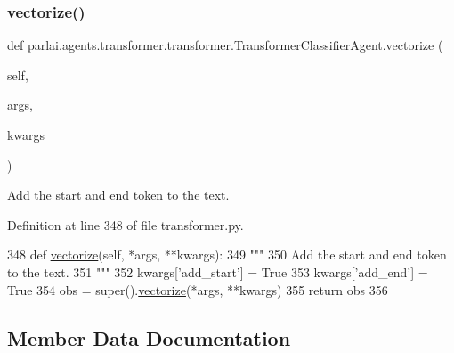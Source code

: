 \subsubsection{\texorpdfstring{vectorize()}{vectorize()}}
{\footnotesize\ttfamily def parlai.\+agents.\+transformer.\+transformer.\+Transformer\+Classifier\+Agent.\+vectorize (\begin{DoxyParamCaption}\item[{}]{self,  }\item[{}]{args,  }\item[{}]{kwargs }\end{DoxyParamCaption})}

\begin{DoxyVerb}Add the start and end token to the text.
\end{DoxyVerb}
 

Definition at line 348 of file transformer.\+py.


\begin{DoxyCode}
348     \textcolor{keyword}{def }\hyperlink{namespaceparlai_1_1agents_1_1drqa_1_1utils_a5c76cc39e3014c7bcf9199d566dbdc0f}{vectorize}(self, *args, **kwargs):
349         \textcolor{stringliteral}{"""}
350 \textcolor{stringliteral}{        Add the start and end token to the text.}
351 \textcolor{stringliteral}{        """}
352         kwargs[\textcolor{stringliteral}{'add\_start'}] = \textcolor{keyword}{True}
353         kwargs[\textcolor{stringliteral}{'add\_end'}] = \textcolor{keyword}{True}
354         obs = super().\hyperlink{namespaceparlai_1_1agents_1_1drqa_1_1utils_a5c76cc39e3014c7bcf9199d566dbdc0f}{vectorize}(*args, **kwargs)
355         \textcolor{keywordflow}{return} obs
356 
\end{DoxyCode}


\subsection{Member Data Documentation}
\mbox{\label{classparlai_1_1agents_1_1transformer_1_1transformer_1_1TransformerClassifierAgent_a3cb00be366fe479790010ea30737c0b4}} 
